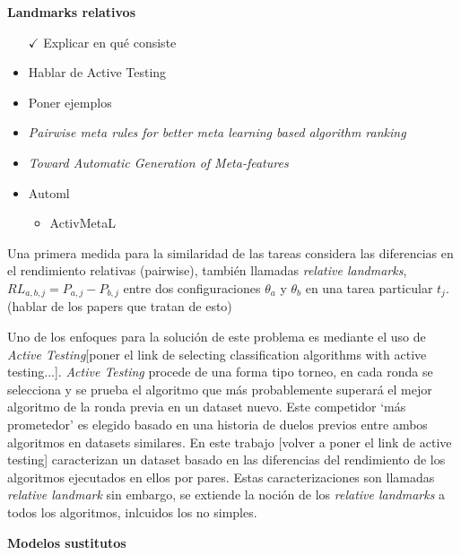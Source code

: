 \quad 

\textbf{Landmarks relativos}

\begin{itemize}
	\item[$\checkmark$] Explicar en qué consiste
	\item Hablar de Active Testing
	\item Poner ejemplos
	\item \textit{Pairwise meta rules for better meta learning based algorithm ranking}
	\item \textit{Toward Automatic Generation of Meta-features}
	\item Automl \begin{itemize}
		\item ActivMetaL
	\end{itemize}
\end{itemize}

\quad

Una primera medida para la similaridad de las tareas considera las diferencias en el rendimiento relativas (pairwise), también llamadas \textit{relative landmarks}, $RL_{a,b,j} = P_{a,j} - P_{b,j}$ entre dos configuraciones $\theta_a$ y $\theta_b$ en una tarea particular $t_j$. (hablar de los papers que tratan de esto) 

Uno de los enfoques para la solución de este problema es mediante el uso de \textit{Active Testing}[poner el link de selecting classification algorithms with active testing...]. \textit{Active Testing} procede de una forma tipo torneo, en cada ronda se selecciona y se prueba el algoritmo que más probablemente superará el mejor algoritmo de la ronda previa en un dataset nuevo. Este competidor `más prometedor' es elegido basado en una historia de duelos previos entre ambos algoritmos en datasets similares. En este trabajo [volver a poner el link de active testing] caracterizan un dataset basado en las diferencias del rendimiento de los algoritmos ejecutados en ellos por pares. Estas caracterizaciones son llamadas \textit{relative landmark} sin embargo, se extiende la noción de los \textit{relative landmarks} a todos los algoritmos, inlcuidos los no simples.

\quad

\textbf{Modelos sustitutos}

